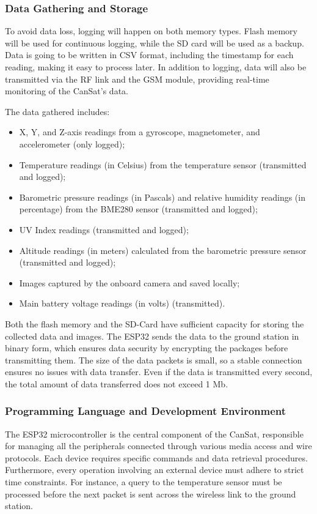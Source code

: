 \documentclass[11pt]{article}
\begin{document}
\subsubsection{Data Gathering and Storage}

To avoid data loss, logging will happen on both memory types. Flash memory will be used for continuous logging, while the SD card will be used as a backup. Data is going to be written in CSV format, including the timestamp for each reading, making it easy to process later. In addition to logging, data will also be transmitted via the RF link and the GSM module, providing real-time monitoring of the CanSat's data.

The data gathered includes:
\begin{itemize}
\item X, Y, and Z-axis readings from a gyroscope, magnetometer, and accelerometer (only logged);
\item Temperature readings (in Celsius) from the temperature sensor (transmitted and logged);
\item Barometric pressure readings (in Pascals) and relative humidity readings (in percentage) from the BME280 sensor (transmitted and logged);
\item UV Index readings (transmitted and logged);
\item Altitude readings (in meters) calculated from the barometric pressure sensor (transmitted and logged);
\item Images captured by the onboard camera and saved locally;
\item Main battery voltage readings (in volts) (transmitted).
\end{itemize}

Both the flash memory and the SD-Card have sufficient capacity for storing the collected data and images. The ESP32 sends the data to the ground station in binary form, which ensures data security by encrypting the packages before transmitting them. The size of the data packets is small, so a stable connection ensures no issues with data transfer. Even if the data is transmitted every second, the total amount of data transferred does not exceed 1 Mb.

\subsubsection{Programming Language and Development Environment}

The ESP32 microcontroller is the central component of the CanSat, responsible for managing all the peripherals connected through various media access and wire protocols. Each device requires specific commands and data retrieval procedures. Furthermore, every operation involving an external device must adhere to strict time constraints. For instance, a query to the temperature sensor must be processed before the next packet is sent across the wireless link to the ground station.
\end{document}
